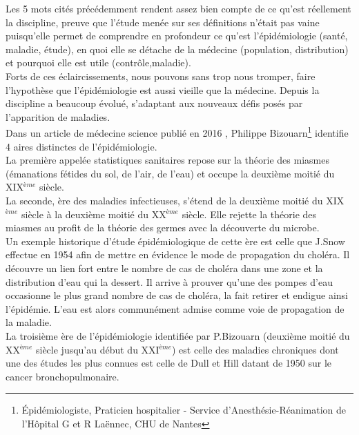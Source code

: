 \documentclass{book}
\begin{document}
\noindent
Les 5 mots cités précédemment rendent assez bien compte de ce qu'est réellement la discipline, preuve que l'étude menée sur ses définitions n'était pas vaine puisqu'elle permet de comprendre en profondeur ce qu'est l'épidémiologie (santé, maladie, étude), en quoi elle se détache de la médecine (population, distribution) et pourquoi elle est utile (contrôle,maladie).\\

\noindent
Forts de ces éclaircissements, nous pouvons sans trop nous tromper, faire l'hypothèse que l'épidémiologie est aussi vieille que la médecine. Depuis la discipline a beaucoup évolué, s'adaptant aux nouveaux défis posés par l'apparition de maladies.\\

\noindent
Dans un article de médecine science publié en 2016  \cite{bizouarn_leco-epidemiologie_2016}, Philippe Bizouarn\footnote{Épidémiologiste, Praticien hospitalier - Service d’Anesthésie-Réanimation de l’Hôpital G et R Laënnec, CHU de Nantes} identifie 4 aires distinctes de l'épidémiologie.\\
La première appelée statistiques sanitaires repose sur la théorie des miasmes (émanations fétides du sol, de l'air, de l'eau) et occupe la deuxième moitié du XIX$^{ème}$ siècle.\\

\noindent
La seconde, ère des maladies infectieuses, s'étend de la deuxième moitié du XIX$^{ème}$ siècle à la deuxième moitié du XX$^{ème}$ siècle. Elle rejette la théorie des miasmes au profit de la théorie des germes avec la découverte du microbe.\\
Un exemple historique d'étude épidémiologique de cette ère est celle que J.Snow effectue en 1954 afin de mettre en évidence le mode de propagation du choléra. Il découvre un lien fort entre le nombre de cas de choléra dans une zone et la distribution d'eau qui la dessert. Il arrive à prouver qu'une des pompes d'eau occasionne le plus grand nombre de cas de choléra, la fait retirer et endigue ainsi l'épidémie. L'eau est alors communément admise comme voie de propagation de la maladie.\\

\noindent
La troisième ère de l'épidémiologie identifiée par P.Bizouarn (deuxième moitié du XX$^{ème}$ siècle jusqu'au début du XXI$^{ème}$) est celle des maladies chroniques dont une des études les plus connues est celle de Dull et Hill datant de 1950 sur le cancer bronchopulmonaire.\\
\end{document}
